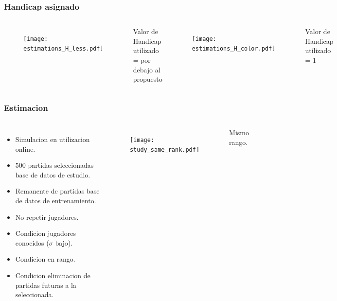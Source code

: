 \documentclass{beamer}
\begin{document}
\begin{frame}
\frametitle{Handicap asignado}
\begin{columns}
 
   \begin{figure}[H]
	\centering
	\texttt{[image: estimations\_H\_less.pdf]}
\end{figure}
  \begin{center}
   Valor de Handicap utilizado = por debajo al propuesto
 \end{center}
  \begin{figure}[H]
	\centering
	\texttt{[image: estimations\_H\_color.pdf]}
\end{figure}
 \begin{center}
   Valor de Handicap utilizado = 1
 \end{center}
\end{columns}

\end{frame}

\begin{frame}
\frametitle{Estimacion}
\begin{columns}
     \begin{itemize}
        \item Simulacion en utilizacion online.
        \item 500 partidas seleccionadas \rightarrow base de datos de estudio.
        \item Remanente de partidas \rightarrow base de datos de entrenamiento.
        \item No repetir jugadores.
        \item Condicion jugadores conocidos ($\sigma$ bajo).
        \item Condicion en rango.
        \item Condicion eliminacion de partidas futuras a la seleccionada.
    \end{itemize} 
 
  \begin{figure}[H]
	\centering
	\texttt{[image: study\_same\_rank.pdf]}
\end{figure}
\begin{center}
 Mismo rango.
\end{center}

\end{columns}


\end{frame}
\end{document}
